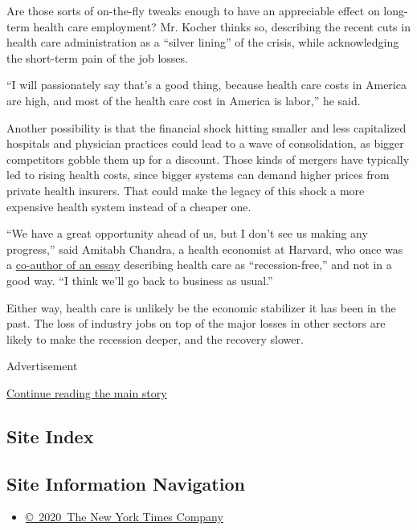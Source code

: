 Are those sorts of on-the-fly tweaks enough to have an appreciable
effect on long-term health care employment? Mr. Kocher thinks so,
describing the recent cuts in health care administration as a ``silver
lining'' of the crisis, while acknowledging the short-term pain of the
job losses.

``I will passionately say that's a good thing, because health care costs
in America are high, and most of the health care cost in America is
labor,'' he said.

Another possibility is that the financial shock hitting smaller and less
capitalized hospitals and physician practices could lead to a wave of
consolidation, as bigger competitors gobble them up for a discount.
Those kinds of mergers have typically led to rising health costs, since
bigger systems can demand higher prices from private health insurers.
That could make the legacy of this shock a more expensive health system
instead of a cheaper one.

``We have a great opportunity ahead of us, but I don't see us making any
progress,'' said Amitabh Chandra, a health economist at Harvard, who
once was a
\href{https://jamanetwork.com/journals/jama/article-abstract/2678994}{co-author
of an essay} describing health care as ``recession-free,'' and not in a
good way. ``I think we'll go back to business as usual.''

Either way, health care is unlikely be the economic stabilizer it has
been in the past. The loss of industry jobs on top of the major losses
in other sectors are likely to make the recession deeper, and the
recovery slower.

Advertisement

\protect\hyperlink{after-bottom}{Continue reading the main story}

\hypertarget{site-index}{%
\subsection{Site Index}\label{site-index}}

\hypertarget{site-information-navigation}{%
\subsection{Site Information
Navigation}\label{site-information-navigation}}

\begin{itemize}
\tightlist
\item
  \href{https://help.nytimes3xbfgragh.onion/hc/en-us/articles/115014792127-Copyright-notice}{©~2020~The
  New York Times Company}
\end{itemize}


